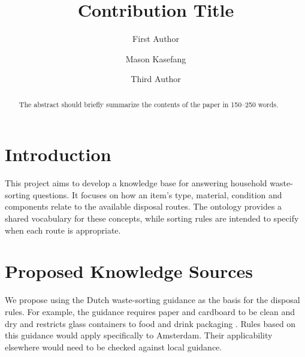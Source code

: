 \documentclass[runningheads]{llncs}
\begin{document}
%
\title{Contribution Title}
%
%
\author{First Author \and
Mason Kasefang \and
Third Author}
%
%
%
\maketitle              %
%
\begin{abstract}
The abstract should briefly summarize the contents of the paper in
150--250 words.

\end{abstract}
%
%
%
\section{Introduction}
This project aims to develop a knowledge base for answering household
waste-sorting questions. It focuses on how an item's type, material, condition
and components relate to the available disposal routes. The ontology provides
a shared vocabulary for these concepts, while sorting rules are intended to
specify when each route is appropriate.

\section{Proposed Knowledge Sources}
We propose using the Dutch waste-sorting guidance as the basis
for the disposal rules. For example, the guidance requires paper and cardboard
to be clean and dry and restricts glass containers to food and drink packaging
\cite{waste-sorting}. Rules based on this guidance would apply specifically
to Amsterdam. Their applicability elsewhere would need to be checked against
local guidance.
\end{document}
